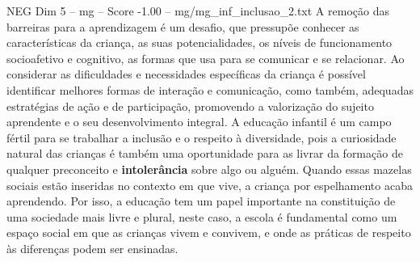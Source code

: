 \begin{textsample}{NEG Dim 5 – mg – Score -1.00 – mg/mg\_inf\_inclusao\_2.txt}
A remoção das barreiras para a aprendizagem é um desafio, que pressupõe conhecer as características da criança, as suas potencialidades, os níveis de funcionamento socioafetivo e cognitivo, as formas que usa para se comunicar e se relacionar.
Ao considerar as dificuldades e necessidades específicas da criança é possível identificar melhores formas de interação e comunicação, como também, adequadas estratégias de ação e de participação, promovendo a valorização do sujeito aprendente e o seu desenvolvimento integral.
A educação infantil é um campo fértil para se trabalhar a inclusão e o respeito à diversidade, pois a curiosidade natural das crianças é também uma oportunidade para as livrar da formação de qualquer preconceito e \textbf{intolerância} sobre algo ou alguém.
Quando essas mazelas sociais estão inseridas no contexto em que vive, a criança por espelhamento acaba aprendendo.
Por isso, a educação tem um papel importante na constituição de uma sociedade mais livre e plural, neste caso, a escola é fundamental como um espaço social em que as crianças vivem e convivem, e onde as práticas de respeito às diferenças podem ser ensinadas.

\end{textsample}
